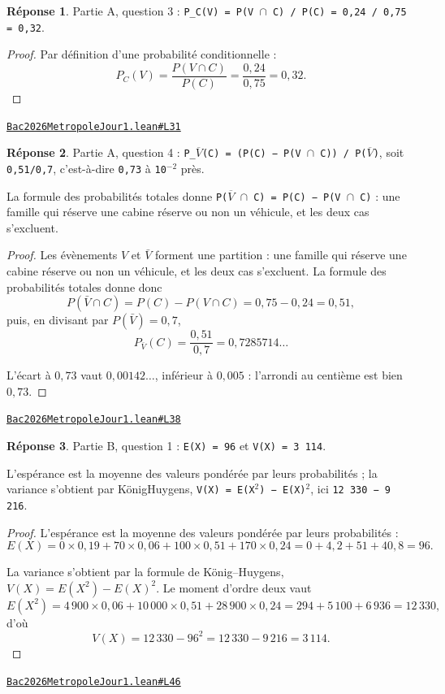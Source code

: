 \documentclass[11pt,a4paper]{article}
\theoremstyle{definition}
\theoremstyle{plain}
\theoremstyle{definition}
\newtheorem*{reponse}{Réponse}
\newcommand{\source}[2]{\par\smallskip\noindent\hfill{\footnotesize\href{#1}{\texttt{#2}}}\par\smallskip}
\begin{document}
\begin{reponse}
Partie A, question 3 : \texttt{P\_C(V) = P(V \(\cap\) C) / P(C) = 0,24 / 0,75 = 0,32}.
\end{reponse}
\begin{proof}
Par définition d'une probabilité conditionnelle :
\[ P_C(V) = \frac{P(V \cap C)}{P(C)} = \frac{0{,}24}{0{,}75} = 0{,}32 . \]
\end{proof}
\source{https://github.com/Commutator-IO/learn-lean/blob/main/exams/2026/Bac2026MetropoleJour1.lean\#L31}{Bac2026MetropoleJour1.lean\#L31}

\begin{reponse}
Partie A, question 4 : \texttt{P\_\(\overline{V}\)(C) = (P(C) − P(V \(\cap\) C)) / P(\(\overline{V}\))}, soit \texttt{0,51/0,7},
c'est-à-dire \texttt{0,73} à \texttt{10\(^{-2}\)} près.

La formule des probabilités totales donne \texttt{P(\(\overline{V}\) \(\cap\) C) = P(C) − P(V \(\cap\) C)} : une famille
qui réserve une cabine réserve ou non un véhicule, et les deux cas s'excluent.
\end{reponse}
\begin{proof}
Les évènements $V$ et $\bar{V}$ forment une partition : une famille qui réserve une cabine
réserve ou non un véhicule, et les deux cas s'excluent. La formule des probabilités
totales donne donc
\[ P(\bar{V} \cap C) = P(C) - P(V \cap C) = 0{,}75 - 0{,}24 = 0{,}51 , \]
puis, en divisant par $P(\bar{V}) = 0{,}7$,
\[ P_{\bar{V}}(C) = \frac{0{,}51}{0{,}7} = 0{,}7285714\ldots \]

L'écart à $0{,}73$ vaut $0{,}00142\ldots$, inférieur à $0{,}005$ : l'arrondi au centième
est bien $0{,}73$.
\end{proof}
\source{https://github.com/Commutator-IO/learn-lean/blob/main/exams/2026/Bac2026MetropoleJour1.lean\#L38}{Bac2026MetropoleJour1.lean\#L38}

\begin{reponse}
Partie B, question 1 : \texttt{E(X) = 96} et \texttt{V(X) = 3 114}.

L'espérance est la moyenne des valeurs pondérée par leurs probabilités ; la variance
s'obtient par König\textendash{}Huygens, \texttt{V(X) = E(X\(^{2}\)) − E(X)\(^{2}\)}, ici \texttt{12 330 − 9 216}.
\end{reponse}
\begin{proof}
L'espérance est la moyenne des valeurs pondérée par leurs probabilités :
\[ E(X) = 0 \times 0{,}19 + 70 \times 0{,}06 + 100 \times 0{,}51 + 170 \times 0{,}24
   = 0 + 4{,}2 + 51 + 40{,}8 = 96 . \]

La variance s'obtient par la formule de König–Huygens, $V(X) = E(X^2) - E(X)^2$. Le moment
d'ordre deux vaut
\[ E(X^2) = 4\,900 \times 0{,}06 + 10\,000 \times 0{,}51 + 28\,900 \times 0{,}24
   = 294 + 5\,100 + 6\,936 = 12\,330 , \]
d'où
\[ V(X) = 12\,330 - 96^2 = 12\,330 - 9\,216 = 3\,114 . \]
\end{proof}
\source{https://github.com/Commutator-IO/learn-lean/blob/main/exams/2026/Bac2026MetropoleJour1.lean\#L46}{Bac2026MetropoleJour1.lean\#L46}
\end{document}
